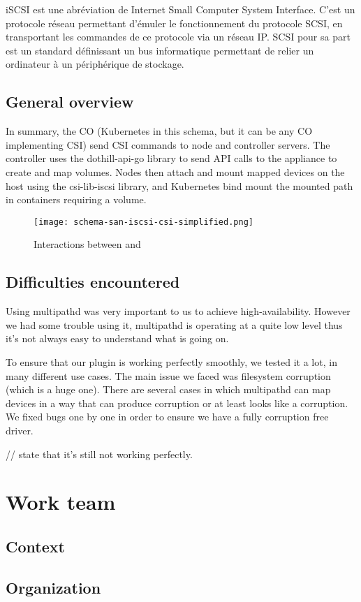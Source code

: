 \color{darkgreen}
iSCSI est une abréviation de Internet Small Computer System Interface. C'est un protocole réseau permettant d'émuler le fonctionnement du protocole SCSI, en transportant les commandes de ce protocole via un réseau IP. SCSI pour sa part est un standard définissant un bus informatique permettant de relier un ordinateur à un périphérique de stockage.
\color{black}

\subsection{General overview}

\color{darkgreen}
In summary, the CO (Kubernetes in this schema, but it can be any CO implementing CSI) send CSI commands to node and controller servers. The controller uses the dothill-api-go library to send API calls to the appliance to create and map volumes. Nodes then attach and mount mapped devices on the host using the csi-lib-iscsi library, and Kubernetes bind mount the mounted path in containers requiring a volume.
\color{black}

\begin{figure}[h]
    \centering
    \texttt{[image: schema-san-iscsi-csi-simplified.png]}
    \caption{Interactions between  and \saniscsicsi}
\end{figure}

\subsection{Difficulties encountered}

\color{darkgreen}
Using multipathd was very important to us to achieve high-availability. However we had some trouble using it, multipathd is operating at a quite low level thus it's not always easy to understand what is going on.

To ensure that our plugin is working perfectly smoothly, we tested it a lot, in many different use cases. The main issue we faced was filesystem corruption (which is a huge one). There are several cases in which multipathd can map devices in a way that can produce corruption or at least looks like a corruption. We fixed bugs one by one in order to ensure we have a fully corruption free driver.

// state that it's still not working perfectly.
\color{black}

\section{Work team}

\subsection{Context}

\subsection{Organization}

\clearpage
